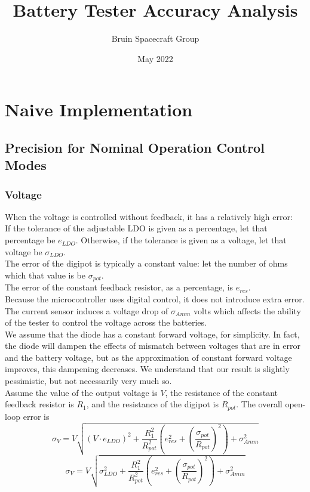 \documentclass{article}
\title{Battery Tester Accuracy Analysis}
\author{Bruin Spacecraft Group}
\date{May 2022}
\begin{document}
\maketitle
\newpage
\section{Naive Implementation}
\subsection{Precision for Nominal Operation Control Modes}
\subsubsection{Voltage}
When the voltage is controlled without feedback, it has a relatively high error:\\
If the tolerance of the adjustable LDO is given as a percentage, let that percentage be $e_{LDO}$. Otherwise, if the tolerance is given as a voltage, let that voltage be $\sigma_{LDO}$.\\
The error of the digipot is typically a constant value: let the number of ohms which that value is be $\sigma_{pot}$.\\
The error of the constant feedback resistor, as a percentage, is $e_{res}$.\\
Because the microcontroller uses digital control, it does not introduce extra error.\\
The current sensor induces a voltage drop of $\sigma_{Amm}$ volts which affects the ability of the tester to control the voltage across the batteries.\\
We assume that the diode has a constant forward voltage, for simplicity. In fact, the diode will dampen the effects of mismatch between voltages that are in error and the battery voltage, but as the approximation of constant forward voltage improves, this dampening decreases. We understand that our result is slightly pessimistic, but not necessarily very much so.\\
Assume the value of the output voltage is $V$, the resistance of the constant feedback resistor is $R_1$, and the resistance of the digipot is $R_{pot}$. The overall open-loop error is
$$\sigma_V = V\sqrt{\left(V\cdot e_{LDO}\right)^{2}+\frac{R_{1}^2}{R_{pot}^2}\left(e_{res}^{2}+\left(\frac{\sigma_{pot}}{R_{pot}}\right)^{2}\right)+\sigma_{Amm}^2}$$
$$\sigma_V = V\sqrt{\sigma_{LDO}^{2}+\frac{R_{1}^2}{R_{pot}^2}\left(e_{res}^{2}+\left(\frac{\sigma_{pot}}{R_{pot}}\right)^{2}\right)+\sigma_{Amm}^2}$$
\end{document}

